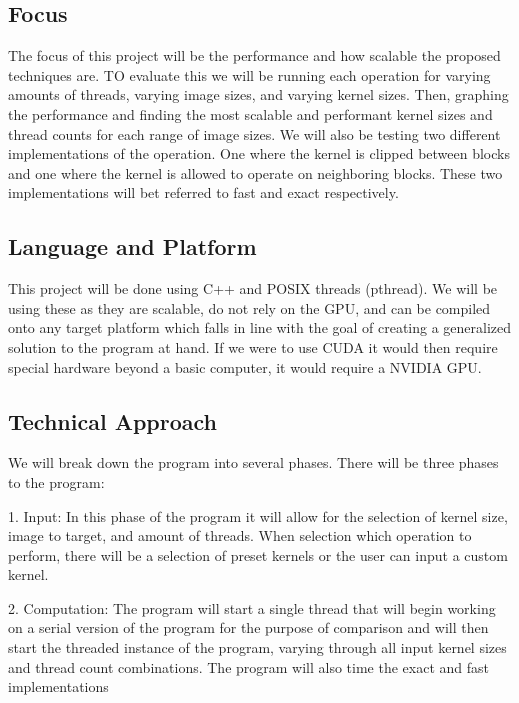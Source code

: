 \documentclass{article}
\begin{document}
\subsection{Focus}

The focus of this project will be the performance and how scalable the proposed techniques are.  TO evaluate this we will be running each operation for varying amounts of threads, varying image sizes, and varying kernel sizes.  Then, graphing the performance and finding the most scalable and performant kernel sizes and thread counts for each range of image sizes.  We will also be testing two different implementations of the operation.  One where the kernel is clipped between blocks and one where the kernel is allowed to operate on neighboring blocks.  These two implementations will bet referred to fast and exact respectively.

\subsection{Language and Platform}

This project will be done using C++ and POSIX threads (pthread).  We will be using these as they are scalable, do not rely on the GPU, and can be compiled onto any target platform which falls in line with the goal of creating a generalized solution to the program at hand.  If we were to use CUDA it would then require special hardware beyond a basic computer, it would require a NVIDIA GPU.

\subsection{Technical Approach}

We will break down the program into several phases.  There will be three phases to the program:


1. Input:  In this phase of the program it will allow for the selection of kernel size, image to target, and amount of threads.  When selection which operation to perform, there will be a selection of preset kernels or the user can input a custom kernel.


2. Computation:  The program will start a single thread that will begin working on a serial version of the program for the purpose of comparison and will then start the threaded instance of the program, varying through all input kernel sizes and thread count combinations.  The program will also time the exact and fast implementations
\end{document}
